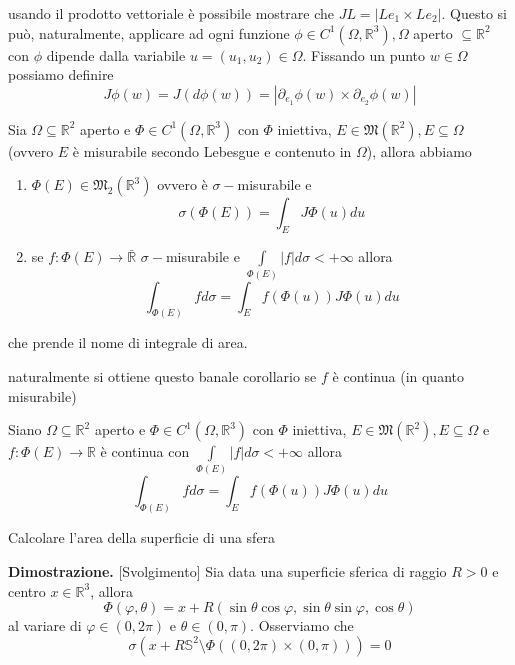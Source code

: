 %
usando il prodotto vettoriale è possibile mostrare che $JL = |Le_1 \times Le_2|$. Questo si può, naturalmente, applicare ad ogni funzione $\phi \in C^1(\Omega, \mathbb{R}^3), \Omega$ aperto $\subseteq \mathbb{R}^2$ con $\phi$ dipende dalla variabile $u = (u_1, u_2) \in \Omega$. Fissando un punto $w \in \Omega$ possiamo definire
$$
J\phi(w) = J(d\phi(w)) = |\partial_{e_1} \phi(w) \times \partial_{e_2} \phi(w)|
$$
%
\vspace{0.5cm}
\begin{theorem}[\textcolor{blue}{H2}]
	Sia $\Omega \subseteq \mathbb{R}^2$ aperto e $\Phi \in C^1(\Omega, \mathbb{R}^3)$ con $\Phi$ iniettiva, $E \in \mathfrak{M}(\mathbb{R}^2), E \subseteq \Omega$ (ovvero $E$ è misurabile secondo Lebesgue e contenuto in $\Omega$), allora abbiamo
	\begin{enumerate}[label=\protect\circled{\arabic*}]
		\item $\Phi(E) \in \mathfrak{M}_2(\mathbb{R}^3)$ ovvero è $\sigma-$misurabile e 
		$$
		\sigma(\Phi(E)) = \int_E J\Phi(u)du
		$$
		\item se $f: \Phi(E) \to \bar{\mathbb{R}}$ $\sigma-$misurabile e $\int\limits_{\Phi(E)} |f|d\sigma < +\infty$ allora
		$$
			\int_{\Phi(E)} fd\sigma = \int_E f(\Phi(u))J\Phi(u)du
		$$
	\end{enumerate}
	che prende il nome di integrale di area.
\end{theorem}
%
naturalmente si ottiene questo banale corollario se $f$ è continua (in quanto misurabile)
%
\vspace{0.5cm}
\begin{cor}
	Siano $\Omega \subseteq \mathbb{R}^2$ aperto e $\Phi \in C^1(\Omega, \mathbb{R}^3)$ con $\Phi$ iniettiva, $E \in \mathfrak{M}(\mathbb{R}^2), E \subseteq \Omega$ e $f: \Phi(E) \to \mathbb{R}$ è continua con
	$\int\limits_{\Phi(E)} |f|d\sigma < +\infty$ allora
	$$
	\int_{\Phi(E)} f d\sigma = \int_E f(\Phi(u)) J\Phi(u)du
	$$
\end{cor}
%
\vspace{0.5cm}
\begin{example}
	Calcolare l'area della superficie di una sfera
\end{example}
%
\noindent \textbf{Dimostrazione. }[Svolgimento]
	Sia data una superficie sferica di raggio $R > 0$ e centro $x \in \mathbb{R}^3$, allora
	$$
	\Phi(\varphi, \theta) = x + R(\sin{\theta} \cos{\varphi}, \sin{\theta}\sin{\varphi}, \cos{\theta})
	$$
	al variare di $\varphi \in (0, 2\pi)$ e $\theta \in (0, \pi)$. Osserviamo che
	$$
	\sigma(x + R\mathbb{S}^2 \setminus \Phi((0, 2\pi) \times (0, \pi))) = 0
	$$
